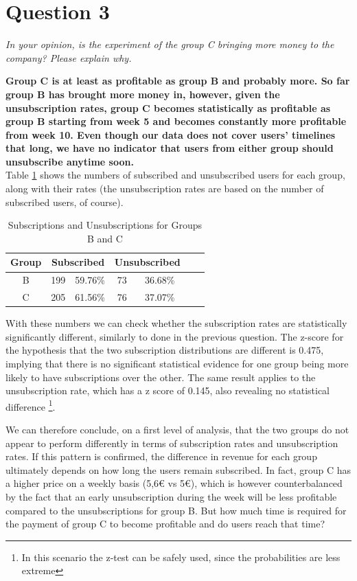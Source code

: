 \documentclass[paper=a4, fontsize=10pt]{report}
\begin{document}
\section*{Question 3}

\textit{In your opinion, is the experiment of the group C bringing more money to the company? Please explain why.}

\textbf{Group C is at least as profitable as group B and probably more. So far group B has brought more money in, however, given the unsubscription rates,
group C becomes statistically as profitable as group B starting from week 5 and becomes constantly more profitable from week 10.
Even though our data does not cover users' timelines that long, we have no indicator that users from either group
should unsubscribe anytime soon.}\\


Table \ref{tab:sub_unsub_rates} shows the numbers of subscribed and unsubscribed users for each group, along with their rates (the unsubscription rates are based on the number of subscribed users, of course).

\begin{table}[htbp]
\normalsize

  \centering
  \caption{Subscriptions and Unsubscriptions for Groups B and C}
    \begin{tabular}{ccccccc}
    \toprule
    \textbf{Group } & \multicolumn{2}{c}{\textbf{Subscribed}} & \multicolumn{2}{c}{\textbf{Unsubscribed}} \\
    \midrule
    B & 199  & 59.76\% & 73  & 36.68\%  \\
    C & 205   & 61.56\% & 76   & 37.07\%  \\
    \bottomrule
    \end{tabular}%
  \label{tab:sub_unsub_rates}%
\end{table}%
\normalsize

With these numbers we can check whether the subscription rates are statistically significantly different, similarly
to done in the previous question. The z-score for the hypothesis that the two subscription distributions are different is 0.475, implying that there is no significant statistical evidence for one group being more likely to have
subscriptions over the other. The same result applies to the unsubscription rate, which has a z score of 0.145, also revealing no statistical difference
\footnote{In this scenario the z-test can be safely used, since the probabilities are less extreme}.

We can therefore conclude, on a first level of analysis, that the two groups do not appear to perform differently in terms of subscription rates and unsubscription rates. If this 
pattern is confirmed, the difference in revenue for each group ultimately depends on how long the users remain subscribed. In fact, group C has a higher
price on a weekly basis (5,6€ vs 5€), which is
however counterbalanced by the fact that an early unsubscription during the week will be less profitable compared to the unsubscriptions for group B. But how much time is required
for the payment of group C to become profitable and do users reach that time?
\end{document}
